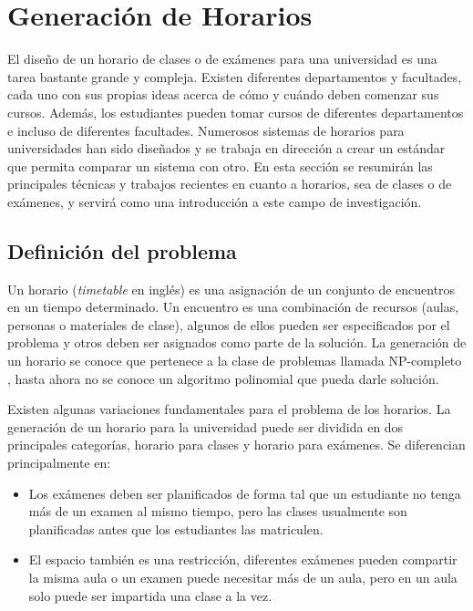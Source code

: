 \chapter{Generaci\'on de Horarios}

El diseño de un horario de clases o de exámenes para una universidad es una tarea bastante grande y compleja.
Existen diferentes departamentos y facultades, cada uno con sus propias ideas acerca de cómo y cuándo deben
comenzar sus cursos. Además, los estudiantes pueden tomar cursos de diferentes departamentos e incluso de
diferentes facultades. Numerosos sistemas de horarios para universidades han sido diseñados y se trabaja
en dirección a crear un estándar que permita comparar un sistema con otro. En esta sección se resumirán
las principales técnicas y trabajos recientes en cuanto a horarios, sea de clases o de exámenes, y servirá
como una introducción a este campo de investigación.

\section{Definición del problema}

Un horario (\emph{timetable} en inglés) es una asignación de un conjunto de encuentros en un tiempo determinado.
Un encuentro es una combinación de recursos (aulas, personas o materiales de clase), algunos de ellos pueden
ser especificados por el problema y otros deben ser asignados como parte de la solución. La generación de un
horario se conoce que pertenece a la clase de problemas llamada NP-completo \cite{TB Cooper and JH Kingston},
hasta ahora no se conoce un algoritmo polinomial que pueda darle solución.

Existen algunas variaciones fundamentales para el problema de los horarios. La generación de un horario para
la universidad puede ser dividida en dos principales categor\'ias, horario para clases y horario para exámenes.
Se diferencian principalmente en:

\begin{itemize}
	\item Los exámenes deben ser planificados de forma tal que un estudiante no tenga más de un examen al
		mismo tiempo, pero las clases usualmente son planificadas antes que los estudiantes las matriculen.
	\item El espacio también es una restricción, diferentes exámenes pueden compartir la misma aula o un examen
		puede necesitar más de un aula, pero en un aula solo puede ser impartida una clase a la vez.
\end{itemize}

